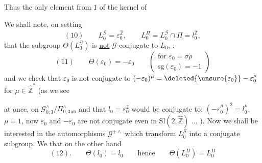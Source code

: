 Thus the only element \inserted{$\Theta$}  from $1$
of the kernel of  


We shall note,  on setting
\[
(10)\qquad L_{0}^{\mathcal{G}}=\varepsilon_{0}^{\widehat{\mathbb{Z}}},\qquad
L_{0}^{\Pi}=L_{0}^{\mathcal{G}}\cap\Pi=l_{0}^{\widehat{\mathbb{Z}}},
\]
that the subgroup $\Theta(L_{0}^{\mathcal{G}})$
is \uline{not} $\mathcal{G}$-conjugate to $L_{0}$,
 
 
\deleted{\unsure{$\Theta\varepsilon$}} :
\[
(11)\qquad \Theta(\varepsilon_{0})=-\varepsilon_{0}
\qquad\left(\begin{gathered}
\text{for }\varepsilon_{0}=\sigma\rho\\
\mathrm{sg}(\varepsilon_{0})=-1
\end{gathered}\right)
\]
and we check that $\varepsilon_{0}$ is not conjugate to
$(-\varepsilon_{0})^{\mu}=\deleted{\unsure{\varepsilon_{0}}}-\varepsilon_{0}^{\mu}$
for  $\mu\in\widehat{\mathbb{Z}}^{*}$ (as we see




at once, on 
$\mathcal{G}_{0,3}^{\wedge}/\Pi_{0,3}^{\wedge}{}_{\mathrm{ab}}$
and  that $l_{0}=\varepsilon_{0}^{2}$ would be
conjugate to: $(-\varepsilon_{0}^{\mu})^{2}=l_{0}^{\mu}$,
 $\mu=1$, now
$\varepsilon_{0}$ and $-\varepsilon_{0}$ are not conjugate
even in $\mathrm{Sl}(2,\widehat{\mathbb{Z}})$ ... ). Now we shall
be interested  in the automorphisms 
$\mathcal{G}^{+\wedge}$ which transform $L_{0}^{\mathcal{G}}$ into a
conjugate subgroup. We  that on the other hand
\[
(12).\qquad \Theta(l_{0})=l_{0}\qquad\text{hence}\qquad
\Theta(L_{0}^{\Pi})=L_{0}^{\Pi}
\]


